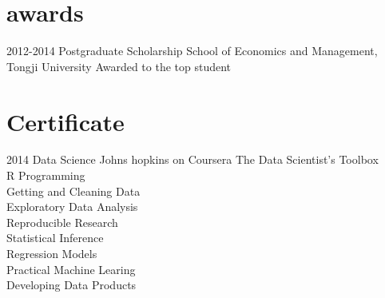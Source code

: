 \documentclass[]{friggeri-cv} %
\begin{document}

\section{awards}

\begin{entrylist}
\entry
{2012-2014}
{Postgraduate Scholarship}
{School of Economics and Management, Tongji University}
{Awarded to the top student}
\end{entrylist}


\section{Certificate}

\begin{entrylist}
\entry
{2014}
{Data Science}
{Johns hopkins on Coursera}
{The Data Scientist's Toolbox\\
R Programming\\
Getting and Cleaning Data\\
Exploratory Data Analysis\\
Reproducible Research\\
Statistical Inference\\
Regression Models\\
Practical Machine Learing\\
Developing Data Products}
\end{entrylist}

\end{document}
